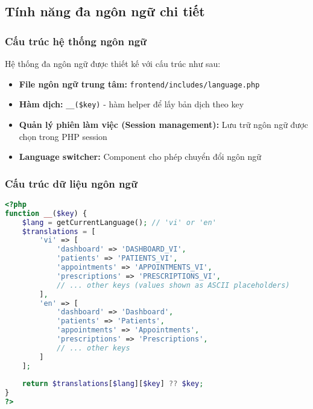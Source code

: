 \documentclass[12pt,a4paper]{report}
\begin{document}
\subsection{Tính năng đa ngôn ngữ chi tiết}
\subsubsection{Cấu trúc hệ thống ngôn ngữ}
Hệ thống đa ngôn ngữ được thiết kế với cấu trúc như sau:
\begin{itemize}
    \item \textbf{File ngôn ngữ trung tâm:} \texttt{frontend/includes/language.php}
    \item \textbf{Hàm dịch:} \texttt{\_\_(\$key)} - hàm helper để lấy bản dịch theo key
    \item \textbf{Quản lý phiên làm việc (Session management):} Lưu trữ ngôn ngữ được chọn trong PHP session
    \item \textbf{Language switcher:} Component cho phép chuyển đổi ngôn ngữ
\end{itemize}

\subsubsection{Cấu trúc dữ liệu ngôn ngữ}
\begin{lstlisting}[language=PHP, caption=language.php structure]
<?php
function __($key) {
    $lang = getCurrentLanguage(); // 'vi' or 'en'
    $translations = [
        'vi' => [
            'dashboard' => 'DASHBOARD_VI',
            'patients' => 'PATIENTS_VI',
            'appointments' => 'APPOINTMENTS_VI',
            'prescriptions' => 'PRESCRIPTIONS_VI',
            // ... other keys (values shown as ASCII placeholders)
        ],
        'en' => [
            'dashboard' => 'Dashboard',
            'patients' => 'Patients',
            'appointments' => 'Appointments',
            'prescriptions' => 'Prescriptions',
            // ... other keys
        ]
    ];
    
    return $translations[$lang][$key] ?? $key;
}
?>
\end{lstlisting}
\end{document}

